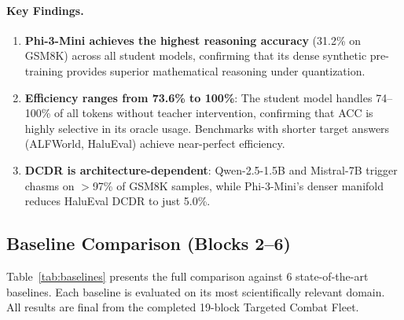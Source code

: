 \documentclass{uai2026}  %
\begin{document}
\paragraph{Key Findings.}
\begin{enumerate}
  \item \textbf{Phi-3-Mini achieves the highest reasoning accuracy} (31.2\% on GSM8K) across all student models, confirming that its dense synthetic pre-training provides superior mathematical reasoning under quantization.
  
  \item \textbf{Efficiency ranges from 73.6\% to 100\%}: The student model handles 74--100\% of all tokens without teacher intervention, confirming that ACC is highly selective in its oracle usage. Benchmarks with shorter target answers (ALFWorld, HaluEval) achieve near-perfect efficiency.
  
  \item \textbf{DCDR is architecture-dependent}: Qwen-2.5-1.5B and Mistral-7B trigger chasms on $>$97\% of GSM8K samples, while Phi-3-Mini's denser manifold reduces HaluEval DCDR to just 5.0\%.
\end{enumerate}

\subsection{Baseline Comparison (Blocks 2--6)}
\label{subsec:baselines}

Table~\ref{tab:baselines} presents the full comparison against 6 state-of-the-art baselines.
Each baseline is evaluated on its most scientifically relevant domain.
All results are final from the completed 19-block Targeted Combat Fleet.
\end{document}
